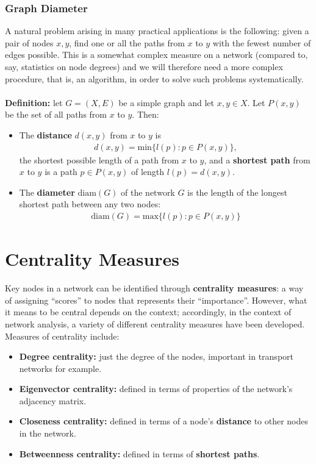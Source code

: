 \documentclass[a4paper,11pt]{article}
\begin{document}
\subsubsection{Graph Diameter}
A natural problem arising in many practical applications is the following: given a pair of nodes $x,y$, find one or all the paths from $x$ to $y$ with the fewest number of edges possible.
This is a somewhat complex measure on a network (compared to, say, statistics on node degrees) and we will therefore need a more complex procedure, that is, an algorithm, in order to solve such problems systematically.
\\\\
\textbf{Definition:} let $G=(X,E)$ be a simple graph and let $x,y \in X$.
Let $P(x,y)$ be the set of all paths from $x$ to $y$.
Then:
\begin{itemize}
    \item   The \textbf{distance} $d(x,y)$ from $x$ to $y$ is
            \begin{align*}
                d(x,y) = \text{min}\{ l(p) : p \in P(x,y) \},
            \end{align*}
            the shortest possible length of a path from $x$ to $y$, and a \textbf{shortest path} from $x$ to $y$ is a path $p \in P(x,y)$ of length $l(p) = d(x,y)$.

    \item   The \textbf{diameter} $\text{diam}(G)$ of the network $G$ is the length of the longest shortest path between any two nodes:
            \begin{align*}
                \text{diam}(G) = \text{max}\{ l(p) : p \in P(x,y) \}
            \end{align*}
\end{itemize}


\section{Centrality Measures}
Key nodes in a network can be identified through \textbf{centrality measures}: a way of assigning ``scores'' to nodes that represents their ``importance''.
However, what it means to be central depends on the context;
accordingly, in the context of network analysis, a variety of different centrality measures have been developed.
Measures of centrality include:
\begin{itemize}
    \item   \textbf{Degree centrality:} just the degree of the nodes, important in transport networks for example.
    \item   \textbf{Eigenvector centrality:} defined in terms of properties of the network's adjacency matrix.
    \item   \textbf{Closeness centrality:} defined in terms of a node's \textbf{distance} to other nodes in the network.
    \item   \textbf{Betweenness centrality:} defined in terms of \textbf{shortest paths}.
\end{itemize}
\end{document}
